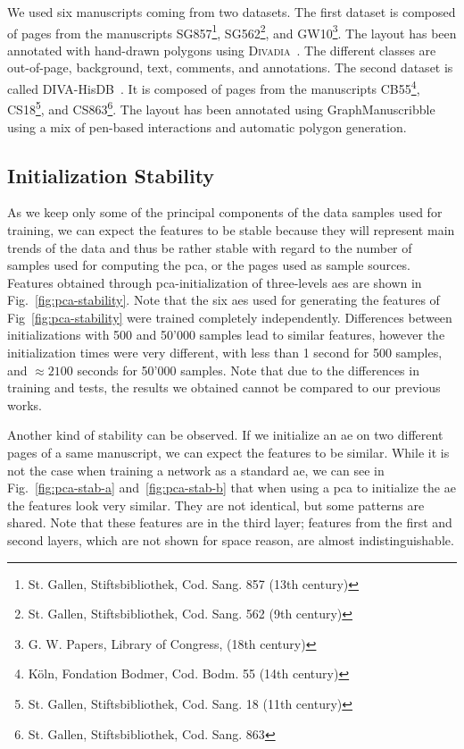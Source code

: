 \documentclass[conference]{IEEEtran}
\begin{document}
We used six manuscripts coming from two datasets.
The first dataset is composed of pages from the manuscripts SG857\footnote{St. Gallen, Stiftsbibliothek, Cod. Sang. 857 (13th century)}, SG562\footnote{St. Gallen, Stiftsbibliothek, Cod. Sang. 562 (9th century)}, and GW10\footnote{G. W. Papers, Library of Congress, (18th century)}.
The layout has been annotated with hand-drawn polygons using \textsc{Divadia}~\cite{chen-gt}.
The different classes are out-of-page, background, text, comments, and annotations.
The second dataset is called DIVA-HisDB~\cite{simistira1656a}.
It is composed of pages from the manuscripts CB55\footnote{K\"oln, Fondation Bodmer, Cod. Bodm. 55 (14th century)}, CS18\footnote{St. Gallen, Stiftsbibliothek, Cod. Sang. 18 (11th century)}, and CS863\footnote{St. Gallen, Stiftsbibliothek, Cod. Sang. 863}.
The layout has been annotated using GraphManuscribble~\cite{garz16creating} using a mix of pen-based interactions and automatic polygon generation.

\subsection{Initialization Stability}
As we keep only some of the principal components of the data samples used for training, we can expect the features to be stable because they will represent main trends of the data and thus be rather stable with regard to the number of samples used for computing the \ac{pca}, or the pages used as sample sources.
Features obtained through \ac{pca}-initialization of three-levels \acp{ae} are shown in Fig.~\ref{fig:pca-stability}.
Note that the six \acp{ae} used for generating the features of Fig~\ref{fig:pca-stability} were trained completely independently.
Differences between initializations with 500 and 50'000 samples lead to similar features, however the initialization times were very different, with less than 1 second for 500 samples, and $\approx2100$ seconds for 50'000 samples.
Note that due to the differences in training and tests, the results we obtained cannot be compared to our previous works.

Another kind of stability can be observed.
If we initialize an \ac{ae} on two different pages of a same manuscript, we can expect the features to be similar.
While it is not the case when training a network as a standard \ac{ae}, we can see in Fig.~\ref{fig:pca-stab-a} and~\ref{fig:pca-stab-b} that when using a \ac{pca} to initialize the \ac{ae} the features look very similar.
They are not identical, but some patterns are shared.
Note that these features are in the third layer; features from the first and second layers, which are not shown for space reason, are almost indistinguishable.
\end{document}
